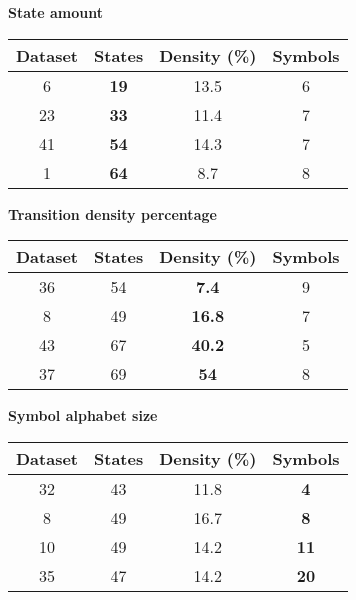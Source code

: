 \begin{table}
\centering
{
\textbf{State amount}

\begin{tabular}{| c | c | c | c |}
  \hline
  Dataset 	& \textbf{States} 	& Density (\%) 	& Symbols \\  \hline
  6 			& \textbf{19 }			&	13.5				& 6 \\
  23 			& \textbf{33} 			&	11.4				& 7 \\
  41			& \textbf{54} 			&	14.3				& 7 \\
  1				& \textbf{64} 			&	8.7				& 8 \\ \hline
\end{tabular}

\textbf{Transition density percentage}

\begin{tabular}{| c | c | c | c |}
  \hline
  Dataset 	& States  			& \textbf{Density (\%)} 		& Symbols \\  \hline
  36 			&	54					& \textbf{7.4 }						& 9 \\
  8 			&	49					& \textbf{16.8 }					& 7 \\
  43			&	67					& \textbf{40.2 }					& 5 \\
  37			&	69					& \textbf{54 	}					& 8 \\ \hline
\end{tabular}


\textbf{Symbol alphabet size}

\begin{tabular}{| c | c | c | c |}
  \hline
  Dataset 	& States	 	& Density (\%) 	& \textbf{Symbols}	 \\  \hline
  32 			& 43				& 11.8				& \textbf{4}		\\
  8 			& 49				& 16.7 				& \textbf{8}		\\
  10			& 49				& 14.2 				& \textbf{11}	\\
  35			& 47				& 14.2 				& \textbf{20}	\\ \hline
\end{tabular}

}
\end{table}